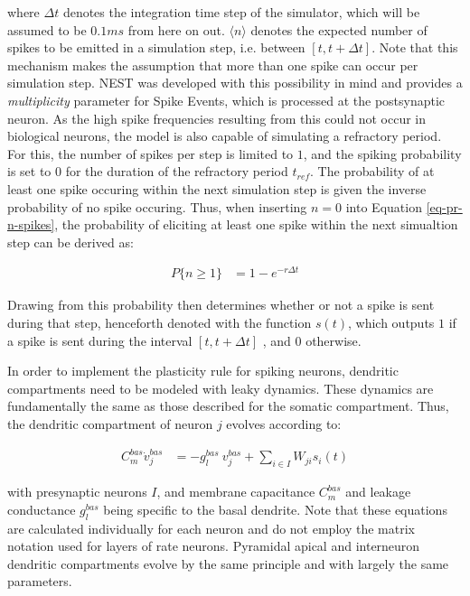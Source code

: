 where $\Delta t$ denotes the integration time step of the simulator, which will be assumed to be $0.1 ms$ from here on
out.  $\langle \textit{n} \rangle$ denotes the expected number of spikes to be emitted in a simulation step, i.e.
between $[t, t+ \Delta t]$. Note that this mechanism makes the assumption that more than one spike can occur per
simulation step. NEST was developed with this possibility in mind and provides a \textit{multiplicity} parameter for
Spike Events, which is processed at the postsynaptic neuron. As the high spike frequencies resulting from this could not
occur in biological neurons, the model is also capable of simulating a refractory period. For this, the number of spikes
per step is limited to $1$, and the spiking probability is set to 0 for the duration of the refractory period $t_{ref}$.
The probability of at least one spike occuring within the next simulation step is given the inverse probability of no
spike occuring. Thus, when inserting $n=0$ into Equation \ref{eq-pr-n-spikes}, the probability of eliciting at least one
spike within the next simualtion step can be derived as:

\begin{align}
  P\{ \textit{n} \geq 1\} & = 1 - e^{-r \Delta t}
\end{align}


Drawing from this probability then determines whether or not a spike is sent during that step, henceforth denoted with
the function $s(t)$, which outputs $1$ if a spike is sent during the interval $[t, t+\Delta t]$ , and $0$ otherwise. \newline

In order to implement the plasticity rule for spiking neurons, dendritic compartments need to be modeled with leaky
dynamics. These dynamics are fundamentally the same as those described for the somatic compartment. Thus, the dendritic
compartment of neuron $j$ evolves according to:

\begin{align}
  C_m^{bas} \dot{v}_j^{bas} & = -g_l^{bas} \  v_j^{bas} + \sum_{i \in I} W_{ji} s_i(t)     \label{eq-spiking-basal-compartment}
\end{align}

with presynaptic neurons $I$, and membrane capacitance $C_m^{bas}$ and leakage conductance $g_l^{bas}$ being specific to
the basal dendrite. Note that these equations are calculated individually for each neuron and do not employ the matrix
notation used for layers of rate neurons. Pyramidal apical and interneuron dendritic compartments evolve by the same
principle and with largely the same parameters.

